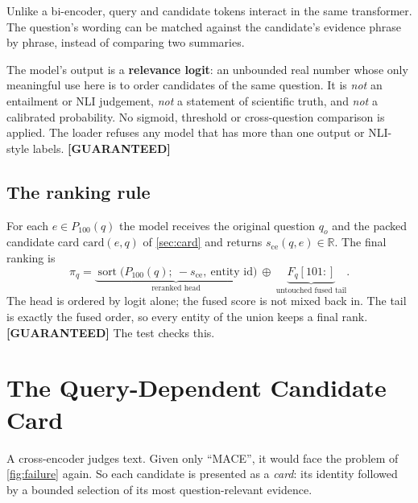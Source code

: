 \documentclass[11pt,a4paper]{article}
\newcommand{\cref}[1]{\autoref{#1}}
\theoremstyle{remark}
\newcommand{\R}{\mathbb{R}}
\newcommand{\vtag}[2]{{\sffamily\scriptsize\bfseries\textcolor{#1}{[#2]}}}
\newcommand{\Gtag}{\vtag{accent}{GUARANTEED}}
\begin{document}
\begin{keybox}
Unlike a bi-encoder, query and candidate tokens interact in the same transformer. The
question's wording can be matched against the candidate's evidence phrase by phrase,
instead of comparing two summaries.
\end{keybox}

\begin{cautionbox}
The model's output is a \textbf{relevance logit}: an unbounded real number whose only
meaningful use here is to order candidates of the same question. It is \emph{not} an
entailment or NLI judgement, \emph{not} a statement of scientific truth, and \emph{not} a
calibrated probability. No sigmoid, threshold or cross-question comparison is applied.
The loader refuses any model that has more than one output or NLI-style labels. \Gtag
\end{cautionbox}

\subsection{The ranking rule}

For each $e\in P_{100}(q)$ the model receives the original question $q_o$ and the packed
candidate card $\mathrm{card}(e,q)$ of \cref{sec:card} and returns
$s_{\mathrm{ce}}(q,e)\in\R$. The final ranking is
\begin{equation}
  \pi_q=\underbrace{\operatorname{sort}\bigl(P_{100}(q);\ -s_{\mathrm{ce}},\ \text{entity id}\bigr)}_{\text{reranked head}}
  \ \oplus\ \underbrace{F_q[101{:}]}_{\text{untouched fused tail}} .
\label{eq:final}
\end{equation}
The head is ordered by logit alone; the fused score is not mixed back in. The tail is
exactly the fused order, so every entity of the union keeps a final rank. \Gtag{} The
test  checks this.

\section{The Query-Dependent Candidate Card}
\label{sec:card}

A cross-encoder judges text. Given only ``MACE'', it would face the problem of
\cref{fig:failure} again. So each candidate is presented as a \emph{card}: its identity
followed by a bounded selection of its most question-relevant evidence.
\end{document}
